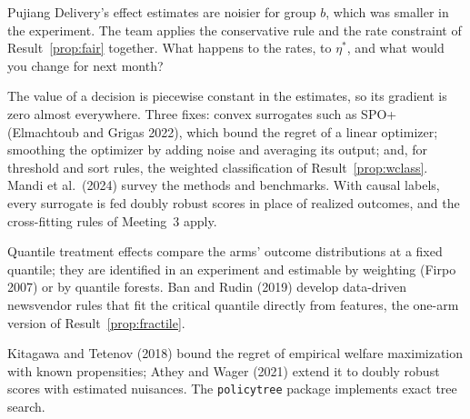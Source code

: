 \documentclass[11pt]{article}
\begin{document}
\begin{exercise}[judgment]
Pujiang Delivery's effect estimates are noisier for group $b$, which was smaller in the experiment. The team applies the conservative
rule and the rate constraint of Result~\ref{prop:fair} together. What happens to the rates, to $\eta^\ast$, and what would you change
for next month?
\end{exercise}

\sectionthree

\begin{extension}
The value of a decision is piecewise constant in the estimates, so its gradient is zero almost everywhere. Three fixes:
convex surrogates such as SPO+ (Elmachtoub and Grigas 2022), which bound the regret of a linear optimizer; smoothing the
optimizer by adding noise and averaging its output; and, for threshold and sort rules, the weighted classification of
Result~\ref{prop:wclass}. Mandi et al.\ (2024) survey the methods and benchmarks. With causal labels, every surrogate is fed
doubly robust scores in place of realized outcomes, and the cross-fitting rules of Meeting~3 apply.
\end{extension}

\begin{extension}
Quantile treatment effects compare the arms' outcome distributions at a fixed quantile; they are identified in an experiment
and estimable by weighting (Firpo 2007) or by quantile forests. Ban and Rudin (2019) develop data-driven newsvendor rules
that fit the critical quantile directly from features, the one-arm version of Result~\ref{prop:fractile}.
\end{extension}

\begin{extension}
Kitagawa and Tetenov (2018) bound the regret of empirical welfare maximization with known propensities; Athey and Wager (2021)
extend it to doubly robust scores with estimated nuisances. The \texttt{policytree} package implements exact tree search.
\end{extension}
\end{document}

